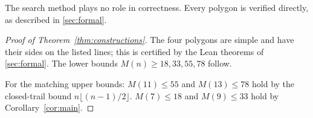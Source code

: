 The search method plays no role in correctness. Every polygon is verified directly, as described in
\cref{sec:formal}.

\begin{proof}[Proof of Theorem~\ref{thm:constructions}]
The four polygons are simple and have their sides on the listed lines; this is certified by the
Lean theorems of \cref{sec:formal}. The lower bounds $M(n)\ge 18,33,55,78$ follow.

For the matching upper bounds: $M(11)\le 55$ and $M(13)\le 78$ hold by the closed-trail bound
$n\lfloor (n-1)/2\rfloor$. $M(7)\le 18$ and $M(9)\le 33$ hold by Corollary~\ref{cor:main}.
\end{proof}
